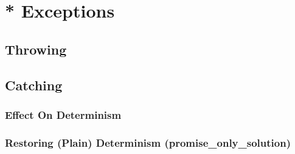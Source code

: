 \section{* Exceptions}
\subsection{Throwing}
\subsection{Catching}
\subsubsection{Effect On Determinism}
\subsubsection{Restoring (Plain) Determinism (promise\_only\_solution)}




